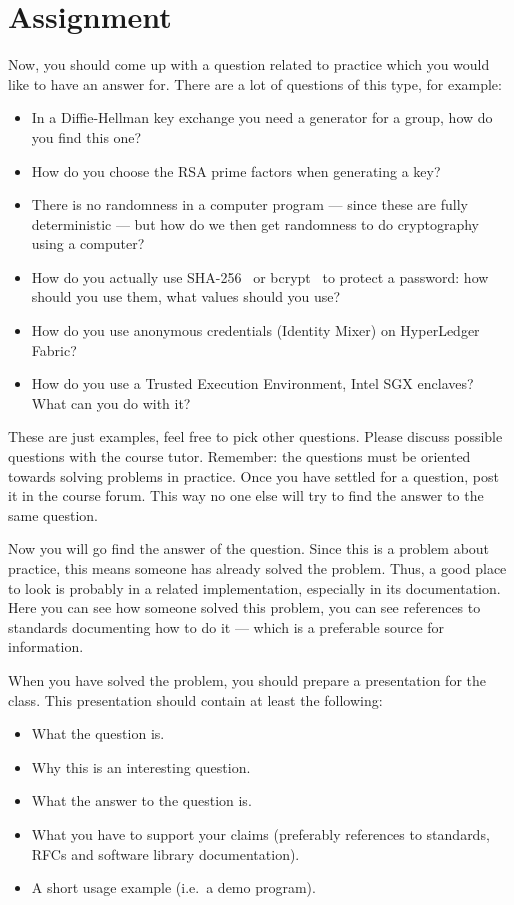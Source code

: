 \section{Assignment}%
\label{sec:tasks}
Now, you should come up with a question related to practice which you would 
like to have an answer for.
There are a lot of questions of this type, for example:
\begin{itemize}
  \item In a Diffie-Hellman key exchange you need a generator for a group, how 
    do you find this one?

  \item How do you choose the RSA prime factors when generating a key?

  \item There is no randomness in a computer program --- since these are fully 
    deterministic --- but how do we then get randomness to do cryptography 
    using a computer?

  \item How do you actually use SHA-256~\cite{shs} or bcrypt~\cite{bcrypt} to 
    protect a password: how should you use them, what values should you use?

  \item How do you use anonymous credentials (Identity Mixer) on HyperLedger 
    Fabric?

  \item How do you use a Trusted Execution Environment, \eg Intel SGX enclaves?
    What can you do with it?
\end{itemize}
These are just examples, feel free to pick other questions.
Please discuss possible questions with the course tutor.
Remember: the questions must be oriented towards solving problems in practice.
Once you have settled for a question, post it in the course forum.
This way no one else will try to find the answer to the same question.

Now you will go find the answer of the question.
Since this is a problem about practice, this means someone has already solved 
the problem.
Thus, a good place to look is probably in a related implementation, especially 
in its documentation.
Here you can see how someone solved this problem, you can see references to 
standards documenting how to do it --- which is a preferable source for 
information.

When you have solved the problem, you should prepare a presentation for the 
class.
This presentation should contain at least the following:
\begin{itemize}
  \item What the question is.
  \item Why this is an interesting question.
  \item What the answer to the question is.
  \item What you have to support your claims (preferably references to 
    standards, RFCs and software library documentation).
  \item A short usage example (i.e.~a demo program).
\end{itemize}


